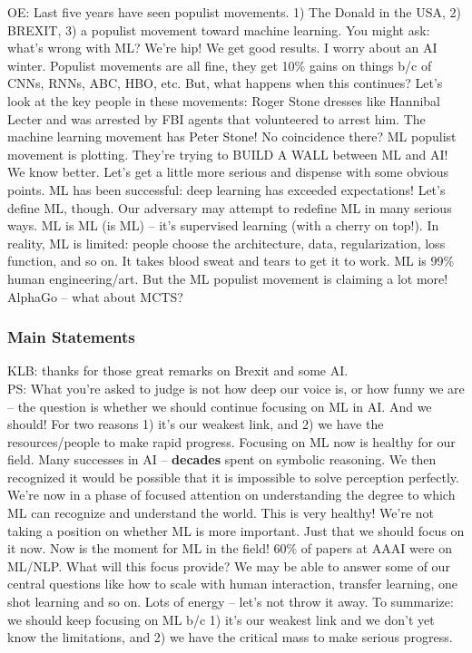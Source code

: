OE: Last five years have seen populist movements. 1) The Donald in the USA, 2) BREXIT, 3) a populist movement toward machine learning. You might ask: what's wrong with ML? We're hip! We get good results. I worry about an AI winter. Populist movements are all fine, they get 10\% gains on things b/c of CNNs, RNNs, ABC, HBO, etc. But, what happens when this continues? Let's look at the key people in these movements: Roger Stone dresses like Hannibal Lecter and was arrested by FBI agents that volunteered to arrest him. The machine learning movement has Peter Stone! No coincidence there? ML populist movement is plotting. They're trying to BUILD A WALL between ML and AI! We know better. Let's get a little more serious and dispense with some obvious points. ML has been successful: deep learning has exceeded expectations! Let's define ML, though. Our adversary may attempt to redefine ML in many serious ways. ML is ML (is ML) -- it's supervised learning (with a cherry on top!). In reality, ML is limited: people choose the architecture, data, regularization, loss function, and so on. It takes blood sweat and tears to get it to work. ML is 99\% human engineering/art. But the ML populist movement is claiming a lot more! AlphaGo -- what about MCTS?

\subsubsection{Main Statements}

KLB: thanks for those great remarks on Brexit and some AI. \\

PS: What you're asked to judge is not how deep our voice is, or how funny we are -- the question is whether we should continue focusing on ML in AI. And we should! For two reasons 1) it's our weakest link, and 2) we have the resources/people to make rapid progress. Focusing on ML now is healthy for our field. Many successes in AI -- {\bf decades} spent on symbolic reasoning. We then recognized it would be possible that it is impossible to solve perception perfectly. We're now in a phase of focused attention on understanding the degree to which ML can recognize and understand the world. This is very healthy! We're not taking a position on whether ML is more important. Just that we should focus on it now. Now is the moment for ML in the field! 60\% of papers at AAAI were on ML/NLP. What will this focus provide? We may be able to answer some of our central questions like how to scale with human interaction, transfer learning, one shot learning and so on. Lots of energy -- let's not throw it away. To summarize: we should keep focusing on ML b/c 1) it's our weakest link and we don't yet know the limitations, and 2) we have the critical mass to make serious progress. \\

